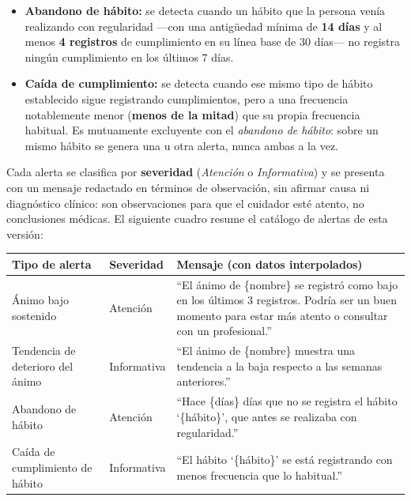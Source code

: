 \documentclass[a4paper,12pt]{article}
\begin{document}
    \begin{itemize}
        \item \textbf{Abandono de hábito:} se detecta cuando un hábito que la persona venía realizando con regularidad —con una antigüedad mínima de \textbf{14 días} y al menos \textbf{4 registros} de cumplimiento en su línea base de 30 días— no registra ningún cumplimiento en los últimos 7 días.
        \item \textbf{Caída de cumplimiento:} se detecta cuando ese mismo tipo de hábito establecido sigue registrando cumplimientos, pero a una frecuencia notablemente menor (\textbf{menos de la mitad}) que su propia frecuencia habitual. Es mutuamente excluyente con el \textit{abandono de hábito}: sobre un mismo hábito se genera una u otra alerta, nunca ambas a la vez.
    \end{itemize}
    \par Cada alerta se clasifica por \textbf{severidad} (\textit{Atención} o \textit{Informativa}) y se presenta con un mensaje redactado en términos de observación, sin afirmar causa ni diagnóstico clínico: son observaciones para que el cuidador esté atento, no conclusiones médicas. El siguiente cuadro resume el catálogo de alertas de esta versión:
    \begin{center}
        \begin{tabular}{ |>{\raggedright\arraybackslash}p{3.4cm}|>{\raggedright\arraybackslash}p{2.2cm}|>{\raggedright\arraybackslash}p{6.7cm}| }
            \hline
            \rowcolor{lightgray} \textbf{Tipo de alerta} & \textbf{Severidad} & \textbf{Mensaje (con datos interpolados)} \\
            \hline
            Ánimo bajo sostenido & Atención & ``El ánimo de \{nombre\} se registró como bajo en los últimos 3 registros. Podría ser un buen momento para estar más atento o consultar con un profesional.'' \\
            \hline
            Tendencia de deterioro del ánimo & Informativa & ``El ánimo de \{nombre\} muestra una tendencia a la baja respecto a las semanas anteriores.'' \\
            \hline
            Abandono de hábito & Atención & ``Hace \{días\} días que no se registra el hábito `\{hábito\}', que antes se realizaba con regularidad.'' \\
            \hline
            Caída de cumplimiento de hábito & Informativa & ``El hábito `\{hábito\}' se está registrando con menos frecuencia que lo habitual.'' \\
            \hline
        \end{tabular}
    \end{center}
\end{document}
